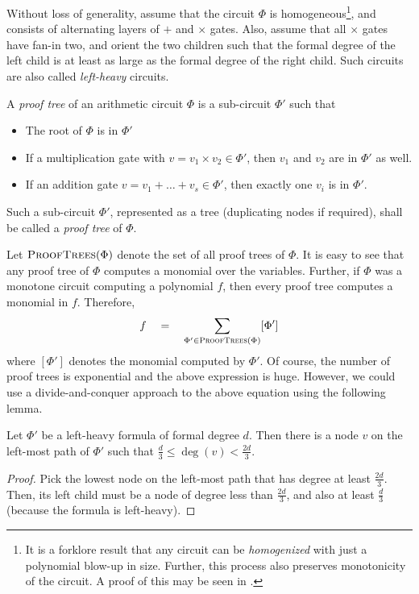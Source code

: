 \documentclass[12pt]{report}
\begin{document}
Without loss of generality, assume that the circuit $\Phi$ is
homogeneous\footnote{It is a forklore result that any circuit can be \emph{homogenized} with just a polynomial blow-up in size. Further, this process also preserves monotonicity of the circuit. A proof of this may be seen in \cite{sy}.}, and consists of alternating layers of $+$ and $\times$
gates. Also, assume that all $\times$ gates have fan-in two, and
orient the two children such that the formal degree of the left child
is at least as large as the formal degree of the right child. Such
circuits are also called \emph{left-heavy} circuits.

\begin{definition}\label{defn:prooftree}
A \emph{proof tree} of an arithmetic circuit $\Phi$ is a sub-circuit $\Phi'$ such that
\begin{itemize}
\item The root of $\Phi$ is in $\Phi'$
\item If a multiplication gate with $v = v_1\times v_2 \in \Phi'$, then $v_1$ and $v_2$ are in $\Phi'$ as well.
\item If an addition gate $v = v_1 + \dots + v_s \in \Phi'$, then
  exactly one $v_i$ is in $\Phi'$.
\end{itemize}
Such a sub-circuit $\Phi'$, represented as a tree (duplicating nodes if
required), shall be called a \emph{proof tree} of $\Phi$.
\end{definition}

\newcommand{\PF}{\textsc{ProofTrees}}

Let $\PF(\Phi)$ denote the set of all proof trees of $\Phi$. It is
easy to see that any proof tree of $\Phi$ computes a monomial over the
variables. Further, if $\Phi$ was a monotone circuit computing a polynomial
$f$, then every proof tree computes a monomial in $f$. Therefore,
$$
f\quad=\quad \sum_{\Phi' \in \PF(\Phi)} [\Phi']
$$
where $[\Phi']$ denotes the monomial computed by $\Phi'$. Of course, the number of proof trees is exponential and the above
expression is huge. However, we could use a divide-and-conquer
approach to the above equation using the following lemma. 

\begin{lemma}\label{lem:brent-two-thirds}
  Let $\Phi'$ be a left-heavy formula of formal degree $d$. Then there
  is a node $v$ on the left-most path of $\Phi'$ such that
  $\frac{d}{3}\leq \deg(v)< \frac{2d}{3}$.
\end{lemma}
\begin{proof}
  Pick the lowest node on the left-most path that has degree at least
  $\frac{2d}{3}$. Then, its left child must be a node of degree less
  than $\frac{2d}{3}$, and also at least $\frac{d}{3}$ (because the
  formula is left-heavy). 
\end{proof}
\end{document}
